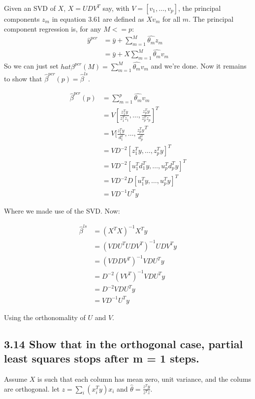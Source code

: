 Given an SVD of $X$, $X = U D V^T$ say, with $V = [v_1,\dots,v_p]$, the principal components $z_m$ in equation 3.61 are defined as $X v_m$ for all $m$.
The principal component regression is, for any $M <= p$:
\begin{align*}
\hat{y}^{pcr} &= \bar{y} + \sum_{m=1}^{M} \hat{\theta_m}z_m\\    
&=  \bar{y} + X \sum_{m=1}^{M} \hat{\theta_m} v_m
\end{align*}
So we can just set $hat{\beta}^{pcr}(M) =  \sum_{m=1}^{M} \hat{\theta_m} v_m$ and we're done. 
Now it remains to show that  $\hat{\beta}^{pcr}(p) = \hat{\beta}^{ls}$.

\begin{align*}
    \hat{\beta}^{pcr}(p) &= \sum_{m=1}^{p} \hat{\theta_m} v_m\\
    &= V [\frac{z_1^T y}{z_1^T z_1}, \dots, \frac{z_p^T y}{z_p^T z_p}]^T\\
    &= V [\frac{z_1^T y}{d_1^2}, \dots, \frac{z_p^T y}{d_p^2}^T\\
    &= V D^{-2}[z_1^T y, \dots, z_p^T y]^T\\
    &= V D^{-2}[u_1^T d_1^T y, \dots, u_p^T d_p^T y]^T\\
    &= V D^{-2} D [u_1^T y, \dots, u_p^T y]^T\\
    &= V D^{-1} U^T y
\end{align*}

Where we made use of the SVD. Now: 

\begin{align*}
    \hat{\beta}^{ls} &= \left(X^T X\right)^{-1} X^T y \\
    &= \left(V D U^T U D V^T\right)^{-1} U D V^T y\\
    &= \left(V D D V^T\right)^{-1} V D U^T y\\
    &= D^{-2}\left(V V^T\right)^{-1} V D U^T y\\
    &= D^{-2} V D U^T y\\
    &= V D^{-1} U^T y
\end{align*}

Using the orthonomality of $U$ and $V$.

\subsection*{3.14 Show that in the orthogonal case, partial least squares stops after m = 1 steps.}

Assume $X$ is such that each column has mean zero, unit variance, and the colums are orthogonal.
let $z = \sum_i \left(x_i^T y\right) x_i$ and $\hat{\theta} = \frac{z^T y} {z^T z}$.

